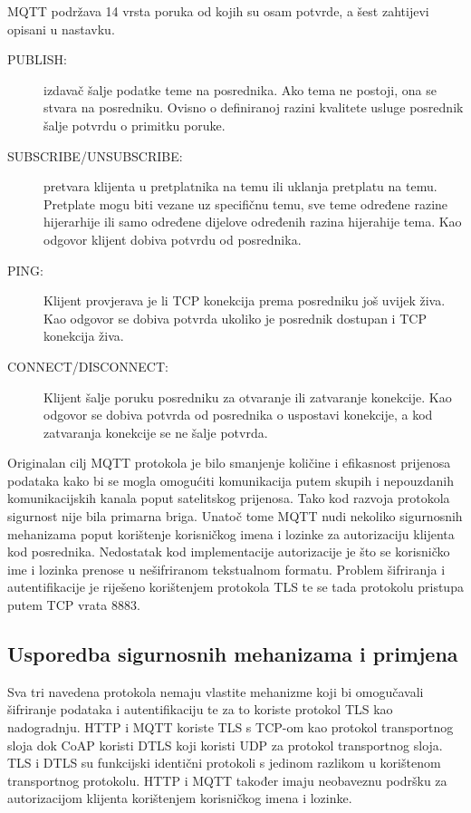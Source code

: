 \documentclass[times, utf8, diplomski]{fer}
\begin{document}
MQTT podržava 14 vrsta poruka od kojih su osam potvrde, a šest zahtijevi opisani u nastavku.
\begin{description}
    \item[PUBLISH:]izdavač šalje podatke teme na posrednika. Ako tema ne postoji, ona se stvara na posredniku. Ovisno o definiranoj razini kvalitete usluge posrednik šalje potvrdu o primitku poruke.
    \item[SUBSCRIBE/UNSUBSCRIBE:]pretvara klijenta u pretplatnika na temu ili uklanja pretplatu na temu. Pretplate mogu biti vezane uz specifičnu temu, sve teme određene razine hijerarhije ili samo određene dijelove određenih razina hijerahije tema. Kao odgovor klijent dobiva potvrdu od posrednika.
    \item[PING:] Klijent provjerava je li TCP konekcija prema posredniku još uvijek živa. Kao odgovor se dobiva potvrda ukoliko je posrednik dostupan i TCP konekcija živa.
    \item[CONNECT/DISCONNECT:] Klijent šalje poruku posredniku za otvaranje ili zatvaranje konekcije. Kao odgovor se dobiva potvrda od posrednika o uspostavi konekcije, a kod zatvaranja konekcije se ne šalje potvrda.
\end{description}

Originalan cilj MQTT protokola je bilo smanjenje količine i efikasnost prijenosa podataka kako bi se mogla omogućiti komunikacija putem skupih i nepouzdanih komunikacijskih kanala poput satelitskog prijenosa. Tako kod razvoja protokola sigurnost nije bila primarna briga. Unatoč tome MQTT nudi nekoliko sigurnosnih mehanizama poput korištenje korisničkog imena i lozinke za autorizaciju klijenta kod posrednika. Nedostatak kod implementacije autorizacije je što se korisničko ime i lozinka prenose u nešifriranom tekstualnom formatu. Problem šifriranja i autentifikacije je riješeno korištenjem protokola TLS te se tada protokolu pristupa putem TCP vrata 8883. 

\subsection{Usporedba sigurnosnih mehanizama i primjena}
Sva tri navedena protokola nemaju vlastite mehanizme koji bi omogučavali šifriranje podataka i autentifikaciju te za to koriste protokol TLS kao nadogradnju. HTTP i MQTT koriste TLS s TCP-om kao protokol transportnog sloja dok CoAP koristi DTLS koji koristi UDP za protokol transportnog sloja. TLS i DTLS su funkcijski identični protokoli s jedinom razlikom u korištenom transportnog protokolu. HTTP i MQTT također imaju neobaveznu podršku za autorizacijom klijenta korištenjem korisničkog imena i lozinke.
\end{document}
